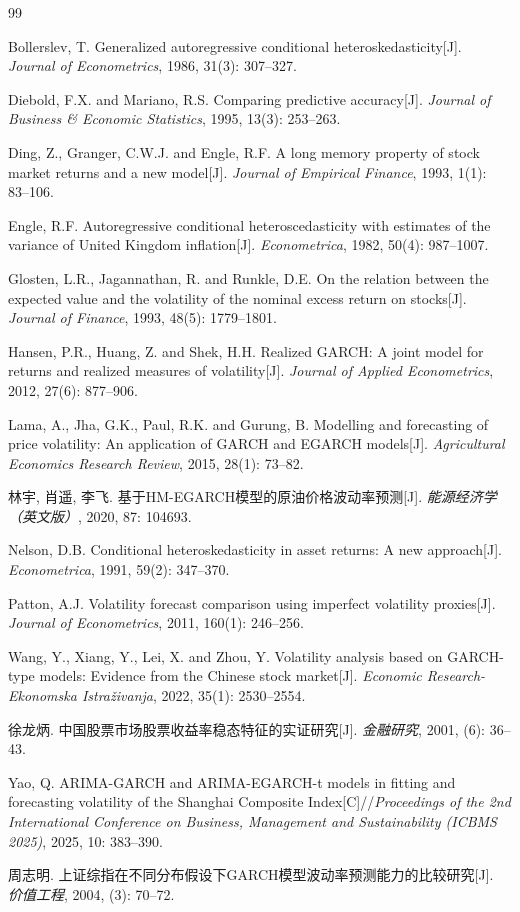 \documentclass[12pt,a4paper]{ctexart}
\begin{document}
\begin{thebibliography}{99}

Bollerslev, T. Generalized autoregressive conditional heteroskedasticity[J]. \emph{Journal of Econometrics}, 1986, 31(3): 307--327.

Diebold, F.X. and Mariano, R.S. Comparing predictive accuracy[J]. \emph{Journal of Business \& Economic Statistics}, 1995, 13(3): 253--263.

Ding, Z., Granger, C.W.J. and Engle, R.F. A long memory property of stock market returns and a new model[J]. \emph{Journal of Empirical Finance}, 1993, 1(1): 83--106.

Engle, R.F. Autoregressive conditional heteroscedasticity with estimates of the variance of United Kingdom inflation[J]. \emph{Econometrica}, 1982, 50(4): 987--1007.

Glosten, L.R., Jagannathan, R. and Runkle, D.E. On the relation between the expected value and the volatility of the nominal excess return on stocks[J]. \emph{Journal of Finance}, 1993, 48(5): 1779--1801.

Hansen, P.R., Huang, Z. and Shek, H.H. Realized GARCH: A joint model for returns and realized measures of volatility[J]. \emph{Journal of Applied Econometrics}, 2012, 27(6): 877--906.

Lama, A., Jha, G.K., Paul, R.K. and Gurung, B. Modelling and forecasting of price volatility: An application of GARCH and EGARCH models[J]. \emph{Agricultural Economics Research Review}, 2015, 28(1): 73--82.

林宇, 肖遥, 李飞. 基于HM-EGARCH模型的原油价格波动率预测[J]. \emph{能源经济学（英文版）}, 2020, 87: 104693.

Nelson, D.B. Conditional heteroskedasticity in asset returns: A new approach[J]. \emph{Econometrica}, 1991, 59(2): 347--370.

Patton, A.J. Volatility forecast comparison using imperfect volatility proxies[J]. \emph{Journal of Econometrics}, 2011, 160(1): 246--256.

Wang, Y., Xiang, Y., Lei, X. and Zhou, Y. Volatility analysis based on GARCH-type models: Evidence from the Chinese stock market[J]. \emph{Economic Research-Ekonomska Istraživanja}, 2022, 35(1): 2530--2554.

徐龙炳. 中国股票市场股票收益率稳态特征的实证研究[J]. \emph{金融研究}, 2001, (6): 36--43.

Yao, Q. ARIMA-GARCH and ARIMA-EGARCH-t models in fitting and forecasting volatility of the Shanghai Composite Index[C]//\emph{Proceedings of the 2nd International Conference on Business, Management and Sustainability (ICBMS 2025)}, 2025, 10: 383--390.

周志明. 上证综指在不同分布假设下GARCH模型波动率预测能力的比较研究[J]. \emph{价值工程}, 2004, (3): 70--72.

\end{thebibliography}
\end{document}
